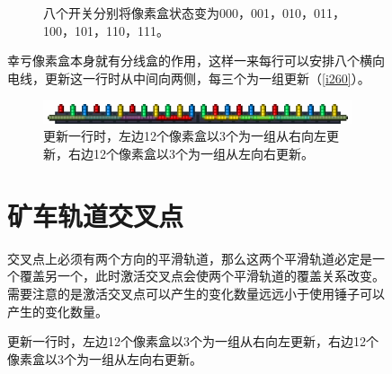 \begin{figure}[!ht]
\begin{figure}[!ht]
\begin{center}
\qquad
{}
\end{center}
\caption{八个开关分别将像素盒状态变为000，001，010，011，100，101，110，111。}
\label{i258:259}
\end{figure}

幸亏像素盒本身就有分线盒的作用，这样一来每行可以安排八个横向电线，更新这一行时从中间向两侧，每三个为一组更新（\autoref{i260}）。

\begin{figure}[!ht]
\centering
\includegraphics{images/260.png}
\caption{更新一行时，左边12个像素盒以3个为一组从右向左更新，右边12个像素盒以3个为一组从左向右更新。}
\label{i260}
\end{figure}

\section{矿车轨道交叉点}
交叉点上必须有两个方向的平滑轨道，那么这两个平滑轨道必定是一个覆盖另一个，此时激活交叉点会使两个平滑轨道的覆盖关系改变。需要注意的是激活交叉点可以产生的变化数量远远小于使用锤子可以产生的变化数量。


\end{figure}
